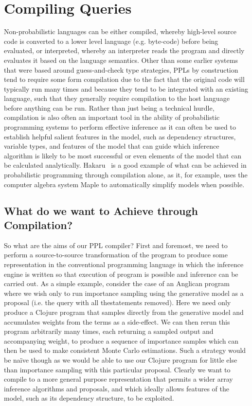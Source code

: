 
\section{Compiling Queries}
\label{sec:proginf:comp}

Non-probabilistic languages can be either compiled, whereby high-level source code
is converted to a lower level language (e.g. byte-code) before being evaluated, or interpreted,
whereby an interpreter reads the program and directly evaluates it based on the language
semantics.  Other than some earlier systems that were based around guess-and-check 
type strategies, PPLs by construction tend to require some form compilation due to the fact that
the original code will typically run many times and because they tend to be integrated
with an existing language, such that they generally require compilation to the host language
before anything can be run.  Rather than just being a technical hurdle, compilation is also 
often an important tool in the ability of probabilistic programming systems to perform
effective inference as it can often be used to establish helpful salient features in the model,
such as dependency structures, variable types, and features of the model that can guide
which inference algorithm is likely to be most successful or even elements of the model
that can be calculated analytically.  Hakaru~\citep{narayanan2016probabilistic} is a good
example of what can be achieved in probabilistic programming through compilation alone,
as it, for example, uses the computer algebra system Maple to automatically simplify models
when possible.

\subsection{What do we want to Achieve through Compilation?}
\label{sec:proginf:comp:want}

So what are the aims of our PPL compiler?  First and foremost, we need to
perform a source-to-source transformation of the program to
produce some representation in the conventional programming language in which
the inference engine is written so that execution of program is possible and inference
can be carried out.  As a simple example, consider the case of an Anglican program where
we wish only to run importance sampling using the generative model as a proposal 
(i.e. the query with all the\observe statements removed).  Here we need only produce a Clojure program
that samples directly from the generative model and accumulates weights from the
\observe terms as a side-effect.  We can then rerun this program arbitrarily many
times, each returning a sampled output and accompanying weight, to produce a sequence
of importance samples which can then be used to make consistent Monte Carlo estimations.
Such a strategy would be na\"{i}ve though as we would be able to use our Clojure program
for little else than importance sampling with this particular proposal.  Clearly we want
to compile to a more general purpose representation that permits a wider array inference algorithms
and proposals, and which ideally allows features of the model, such as its dependency
structure, to be exploited.

